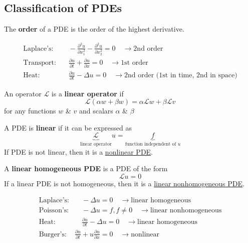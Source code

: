 \subsection{Classification of PDEs}
\begin{definition}
    The \textbf{order} of a PDE is the order of the highest derivative.
\end{definition}
\begin{example}
    \begin{align*}
        \text{Laplace's:} &\quad -\frac{\partial^2 u}{\partial x_1^2} - \frac{\partial^2 u}{\partial x_2^2} = 0 \quad \rightarrow \text{2nd order} \\
        \text{Transport:} &\quad \frac{\partial u}{\partial t} + \frac{\partial u}{\partial x} = 0 \quad \rightarrow \text{1st order} \\
        \text{Heat:} &\quad \frac{\partial u}{\partial t} - \Delta u = 0 \quad \rightarrow \text{2nd order (1st in time, 2nd in space)}
    \end{align*}
\end{example}

\begin{definition}
    An operator $\mathcal{L}$  is a \textbf{linear operator} if
    \[\mathcal{L} (\alpha w + \beta w) = \alpha \mathcal{L}  w + \beta \mathcal{L}  v\]
    for any functions $w$ \& $v$ and scalars $\alpha$ \& $\beta$
\end{definition}

\begin{definition}
    A PDE is \textbf{linear} if it can be expressed as
    \[\underbrace{\mathcal{L}}_{\text{linear operator}} u = \underbrace{f}_{\text{function independent of $u$}}\]
    If PDE is not linear, then it is a \underline{nonlinear PDE}.
\end{definition}

\begin{definition}
    A \textbf{linear homogeneous PDE} is a PDE of the form
    \[\mathcal{L} u = 0\]
    If a linear PDE is not homogeneous, then it is a \underline{linear nonhomogeneous PDE}.
\end{definition}

\begin{example}
    \begin{align*}
        \text{Laplace's:} &\quad -\Delta u =0 \quad \rightarrow \text{linear homogeneous} \\
        \text{Poisson's:} &\quad -\Delta u = f, f\neq 0 \quad \rightarrow \text{linear nonhomogeneous} \\
        \text{Heat:} &\quad \frac{\partial u}{\partial t} - \Delta u = 0 \quad \rightarrow \text{linear homogeneous}\\
        \text{Burger's:} &\frac{\partial u}{\partial t} + u \frac{\partial u}{\partial x} = 0 \quad \rightarrow \text{nonlinear}        
    \end{align*}
\end{example}

